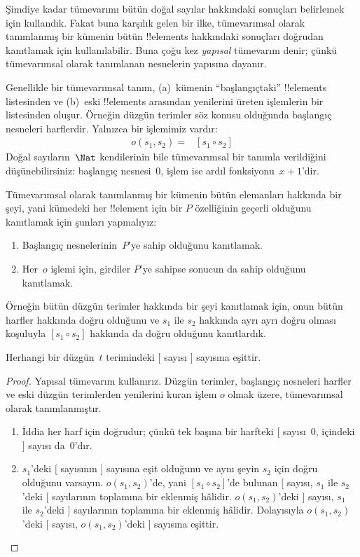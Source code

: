 \documentclass[../../../include/open-logic-section]{subfiles}
\begin{document}


Şimdiye kadar tümevarımı bütün doğal sayılar hakkındaki sonuçları
belirlemek için kullandık. Fakat buna karşılık gelen bir ilke,
tümevarımsal olarak tanımlanmış bir kümenin bütün !!{element}s
hakkındaki sonuçları doğrudan kanıtlamak için kullanılabilir. Buna çoğu
kez \emph{yapısal} tümevarım denir; çünkü tümevarımsal olarak tanımlanan
nesnelerin yapısına dayanır.

Genellikle bir tümevarımsal tanım, (a)~kümenin ``başlangıçtaki''
!!{element}s listesinden ve (b)~eski !!{element}s arasından yenilerini üreten
işlemlerin bir listesinden oluşur. Örneğin düzgün terimler söz konusu
olduğunda başlangıç nesneleri harflerdir. Yalnızca bir işlemimiz vardır:
\begin{align*}
  o(s_1, s_2) = & [s_1 \circ s_2]
\end{align*}
Doğal sayıların~$\Nat$ kendilerinin bile tümevarımsal bir tanımla
verildiğini düşünebilirsiniz: başlangıç nesnesi~$0$, işlem ise ardıl
fonksiyonu~$x + 1$'dir.

Tümevarımsal olarak tanımlanmış bir kümenin bütün elemanları hakkında
bir şeyi, yani kümedeki her !!{element} için bir $P$ özelliğinin geçerli
olduğunu kanıtlamak için şunları yapmalıyız:
\begin{enumerate}
\item Başlangıç nesnelerinin~$P$'ye sahip olduğunu kanıtlamak.
\item Her~$o$ işlemi için, girdiler $P$'ye sahipse sonucun da sahip
  olduğunu kanıtlamak.
\end{enumerate}
Örneğin bütün düzgün terimler hakkında bir şeyi kanıtlamak için, onun
bütün harfler hakkında doğru olduğunu ve $s_1$ ile $s_2$ hakkında ayrı
ayrı doğru olması koşuluyla $[s_1 \circ s_2]$ hakkında da doğru olduğunu
kanıtlardık.

\begin{prop}
  Herhangi bir düzgün~$t$ terimindeki $[$ sayısı $]$ sayısına eşittir.
\end{prop}

\begin{proof}
Yapısal tümevarım kullanırız. Düzgün terimler, başlangıç nesneleri
harfler ve eski düzgün terimlerden yenilerini kuran işlem $o$ olmak
üzere, tümevarımsal olarak tanımlanmıştır.
\begin{enumerate}
\item İddia her harf için doğrudur; çünkü tek başına bir harfteki $[$
  sayısı~$0$, içindeki $]$ sayısı da~$0$'dır.
\item $s_1$'deki $[$ sayısının $]$ sayısına eşit olduğunu ve aynı şeyin
  $s_2$ için doğru olduğunu varsayın. $o(s_1, s_2)$'de, yani $[s_1
  \circ s_2]$'de bulunan $[$ sayısı, $s_1$ ile $s_2$'deki $[$
  sayılarının toplamına bir eklenmiş hâlidir. $o(s_1, s_2)$'deki $]$
  sayısı, $s_1$ ile $s_2$'deki $]$ sayılarının toplamına bir eklenmiş
  hâlidir. Dolayısıyla $o(s_1, s_2)$'deki $[$ sayısı, $o(s_1,s_2)$'deki
  $]$ sayısına eşittir.
\end{enumerate}
\end{proof}
\end{document}
